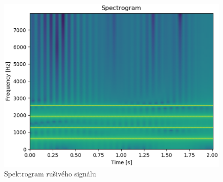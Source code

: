 \documentclass{article}
\begin{document}
  \begin{figure}[H]
    \includegraphics[width=\textwidth]{src/spectrogram_cos.eps}
    \caption{Spektrogram rušivého signálu}
  \end{figure}
\end{document}
